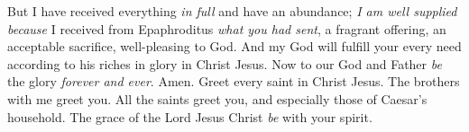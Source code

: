 \begin{biblechapter}
\verse But I have received everything \textit{in full} and have an abundance; \textit{I am well supplied} \textit{because} I received from Epaphroditus \textit{what you had sent}, a fragrant offering, an acceptable sacrifice, well-pleasing to God.
\verse And my God will fulfill your every need according to his riches in glory in Christ Jesus.
\verse Now to our God and Father \textit{be} the glory \textit{forever and ever}. Amen.
 Greet every saint in Christ Jesus. The brothers with me greet you.
\verse All the saints greet you, and especially those of Caesar’s household.
\verse The grace of the Lord Jesus Christ \textit{be} with your spirit.
\end{biblechapter}

